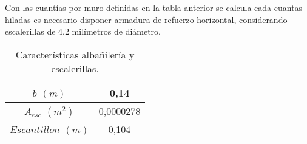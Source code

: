 \newpage
Con las cuantías por muro definidas en la tabla anterior se calcula cada cuantas hiladas es necesario disponer armadura de refuerzo horizontal, considerando escalerillas de 4.2 milímetros de diámetro.

\begin{table}[H]
  \centering
  \caption{Características albañilería y escalerillas.}
  \begin{tabular}{|c|c|}
    \hline
    \boldmath{}\textbf{$b $ $ (m)$}\unboldmath{} & 0,14 \bigstrut\\
    \hline
    \boldmath{}\textbf{$A_{esc} $ $ (m^2)$}\unboldmath{} & 0,0000278 \bigstrut\\
    \hline
    \boldmath{}\textbf{$Escantillon $ $ (m)$}\unboldmath{} & 0,104 \bigstrut\\
    \hline
  \end{tabular}
  \label{albaesca}
\end{table}


